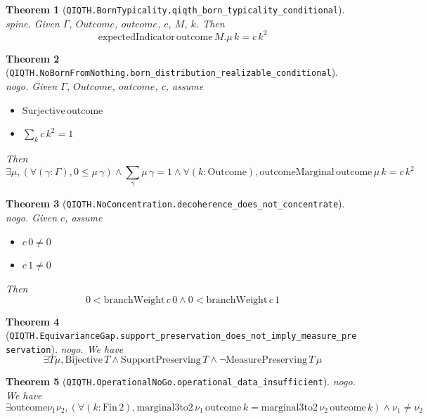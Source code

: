 \documentclass[11pt]{article}
\newtheorem{theorem}{Theorem}[section]
\begin{document}
\begin{theorem}[\texttt{QIQTH.BornTypicality.qiqth\_born\_typicality\_conditional}]\label{thm:qiqth-borntypicality-qiqth-born-typicality-conditional}
\textit{spine.}
Given $Γ$, $Outcome$, $outcome$, $c$, $M$, $k$.
Then \[ \mathrm{expectedIndicator}\,\mathrm{outcome}\,M.\mu\,k = {c\,k}^{2} \]
\end{theorem}


\begin{theorem}[\texttt{QIQTH.NoBornFromNothing.born\_distribution\_realizable\_conditional}]\label{thm:qiqth-nobornfromnothing-born-distribution-realizable-conditional}
\textit{nogo.}
Given $Γ$, $Outcome$, $outcome$, $c$,
assume
\begin{itemize}
  \item[\rm(h\_surj)] $\mathrm{Surjective}\,\mathrm{outcome}$
  \item[\rm(hc\_norm)] $\sum_{k} {c\,k}^{2} = 1$
\end{itemize}
Then \[ \exists \mu, (\forall (\gamma : \Gamma), 0 \le \mu\,\gamma) \wedge \sum_{\gamma} \mu\,\gamma = 1 \wedge \forall (k : \mathrm{Outcome}), \mathrm{outcomeMarginal}\,\mathrm{outcome}\,\mu\,k = {c\,k}^{2} \]
\end{theorem}


\begin{theorem}[\texttt{QIQTH.NoConcentration.decoherence\_does\_not\_concentrate}]\label{thm:qiqth-noconcentration-decoherence-does-not-concentrate}
\textit{nogo.}
Given $c$,
assume
\begin{itemize}
  \item[\rm(h0)] $c\,0 \ne 0$
  \item[\rm(h1)] $c\,1 \ne 0$
\end{itemize}
Then \[ 0 < \mathrm{branchWeight}\,c\,0 \wedge 0 < \mathrm{branchWeight}\,c\,1 \]
\end{theorem}


\begin{theorem}[\texttt{QIQTH.EquivarianceGap.support\_preservation\_does\_not\_imply\_measure\_preservation}]\label{thm:qiqth-equivariancegap-support-preservation-does-not-imply-measure-preservation}
\textit{nogo.}
We have \[ \exists T \mu, \mathrm{Bijective}\,T \wedge \mathrm{SupportPreserving}\,T \wedge \neg \mathrm{MeasurePreserving}\,T\,\mu \]
\end{theorem}


\begin{theorem}[\texttt{QIQTH.OperationalNoGo.operational\_data\_insufficient}]\label{thm:qiqth-operationalnogo-operational-data-insufficient}
\textit{nogo.}
We have \[ \exists \mathrm{outcome} \nu_{1} \nu_{2}, (\forall (k : \mathrm{Fin}\,2), \mathrm{marginal3to2}\,\nu_{1}\,\mathrm{outcome}\,k = \mathrm{marginal3to2}\,\nu_{2}\,\mathrm{outcome}\,k) \wedge \nu_{1} \ne \nu_{2} \]
\end{theorem}
\end{document}
